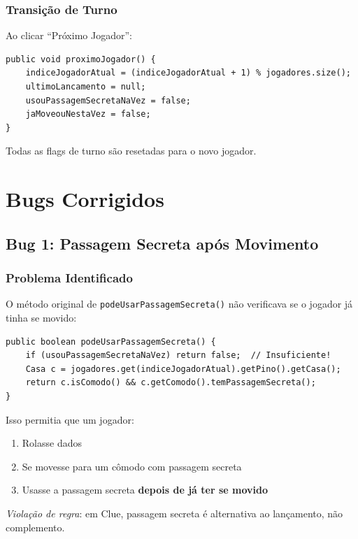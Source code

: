 \documentclass[12pt,a4paper]{report}
\begin{document}
\subsection{Transição de Turno}

Ao clicar ``Próximo Jogador'':

\begin{lstlisting}
public void proximoJogador() {
    indiceJogadorAtual = (indiceJogadorAtual + 1) % jogadores.size();
    ultimoLancamento = null;
    usouPassagemSecretaNaVez = false;
    jaMoveouNestaVez = false;
}
\end{lstlisting}

Todas as flags de turno são resetadas para o novo jogador.

\chapter{Bugs Corrigidos}

\section{Bug 1: Passagem Secreta após Movimento}

\subsection{Problema Identificado}

O método original de \texttt{podeUsarPassagemSecreta()} não verificava se o jogador já tinha se movido:

\begin{lstlisting}
public boolean podeUsarPassagemSecreta() {
    if (usouPassagemSecretaNaVez) return false;  // Insuficiente!
    Casa c = jogadores.get(indiceJogadorAtual).getPino().getCasa();
    return c.isComodo() && c.getComodo().temPassagemSecreta();
}
\end{lstlisting}

Isso permitia que um jogador:
\begin{enumerate}
    \item Rolasse dados
    \item Se movesse para um cômodo com passagem secreta
    \item Usasse a passagem secreta \textbf{depois de já ter se movido}
\end{enumerate}

\textit{Violação de regra}: em Clue, passagem secreta é alternativa ao lançamento, não complemento.
\end{document}
